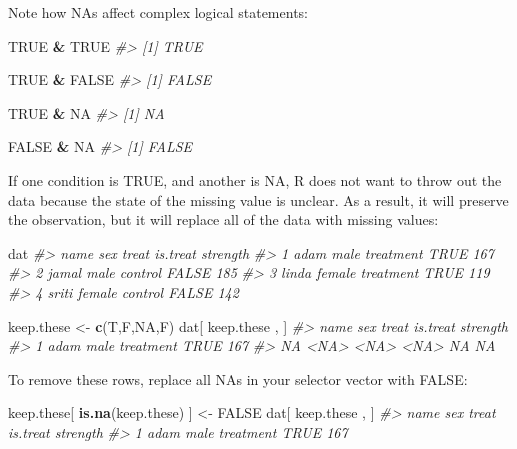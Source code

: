 \documentclass[]{book}
\newenvironment{Shaded}{\begin{snugshade}}{\end{snugshade}}
\newcommand{\CommentTok}[1]{\textcolor[rgb]{0.56,0.35,0.01}{\textit{#1}}}
\newcommand{\KeywordTok}[1]{\textcolor[rgb]{0.13,0.29,0.53}{\textbf{#1}}}
\newcommand{\NormalTok}[1]{#1}
\newcommand{\OperatorTok}[1]{\textcolor[rgb]{0.81,0.36,0.00}{\textbf{#1}}}
\newcommand{\OtherTok}[1]{\textcolor[rgb]{0.56,0.35,0.01}{#1}}
\newcommand{\StringTok}[1]{\textcolor[rgb]{0.31,0.60,0.02}{#1}}
\theoremstyle{definition}
\theoremstyle{definition}
\theoremstyle{definition}
\theoremstyle{remark}
\begin{document}
Note how NAs affect complex logical statements:

\begin{Shaded}
\begin{Highlighting}[]
\OtherTok{TRUE} \OperatorTok{&}\StringTok{ }\OtherTok{TRUE}
\CommentTok{#> [1] TRUE}

\OtherTok{TRUE} \OperatorTok{&}\StringTok{ }\OtherTok{FALSE}
\CommentTok{#> [1] FALSE}

\OtherTok{TRUE} \OperatorTok{&}\StringTok{ }\OtherTok{NA}
\CommentTok{#> [1] NA}

\OtherTok{FALSE} \OperatorTok{&}\StringTok{ }\OtherTok{NA}
\CommentTok{#> [1] FALSE}
\end{Highlighting}
\end{Shaded}

If one condition is TRUE, and another is NA, R does not want to throw
out the data because the state of the missing value is unclear. As a
result, it will preserve the observation, but it will replace all of the
data with missing values:

\begin{Shaded}
\begin{Highlighting}[]
\NormalTok{dat}
\CommentTok{#>    name    sex     treat is.treat strength}
\CommentTok{#> 1  adam   male treatment     TRUE      167}
\CommentTok{#> 2 jamal   male   control    FALSE      185}
\CommentTok{#> 3 linda female treatment     TRUE      119}
\CommentTok{#> 4 sriti female   control    FALSE      142}

\NormalTok{keep.these <-}\StringTok{ }\KeywordTok{c}\NormalTok{(T,F,}\OtherTok{NA}\NormalTok{,F)}
\NormalTok{dat[ keep.these , ]}
\CommentTok{#>    name  sex     treat is.treat strength}
\CommentTok{#> 1  adam male treatment     TRUE      167}
\CommentTok{#> NA <NA> <NA>      <NA>       NA       NA}
\end{Highlighting}
\end{Shaded}

To remove these rows, replace all NAs in your selector vector with
FALSE:

\begin{Shaded}
\begin{Highlighting}[]
\NormalTok{keep.these[ }\KeywordTok{is.na}\NormalTok{(keep.these) ] <-}\StringTok{ }\OtherTok{FALSE}
\NormalTok{dat[ keep.these , ]}
\CommentTok{#>   name  sex     treat is.treat strength}
\CommentTok{#> 1 adam male treatment     TRUE      167}
\end{Highlighting}
\end{Shaded}
\end{document}
